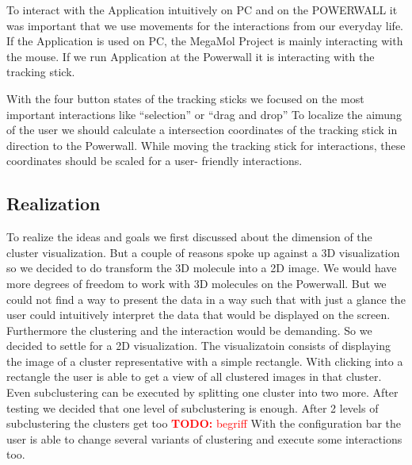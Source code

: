 \documentclass[journal]{vgtc}       %
\newcommand{\todo}[1]{\textcolor{red}{\textbf{TODO:} #1}}
\begin{document}
To interact with the Application intuitively on PC and on the POWERWALL it was important that we use movements for the interactions from our everyday life. If the Application is used on PC, the MegaMol Project is mainly interacting with the mouse. If we run Application at the Powerwall it is interacting with the tracking stick.

With the four button states of the tracking sticks we focused on the most important interactions like ``selection'' or ``drag and drop'' To localize the aimung of the user  we should calculate a intersection coordinates of the tracking stick in direction to the Powerwall. While moving the tracking stick for interactions, these coordinates should be scaled for a user- friendly interactions.

\subsection{Realization}

To realize the ideas and goals we first discussed about the dimension of the cluster visualization. But a couple of reasons spoke up against a 3D visualization so we decided to do transform the 3D molecule into a 2D image. We would have more degrees of freedom to work with 3D molecules on the Powerwall. But we could not find a way to present the data in a way such that with just a glance the user could intuitively interpret the data that would be displayed on the screen. Furthermore the clustering and the interaction would be demanding. So we decided to settle for a 2D visualization. 
The visualizatoin consists of displaying the image of a cluster representative with a simple rectangle. With clicking into a rectangle the user is able to get a view of all clustered images in that cluster. Even subclustering can be executed by splitting one cluster into two more. After testing we decided that one level of subclustering is enough. After 2 levels of subclustering the clusters get too  \todo{begriff}
With the configuration bar the user is able to change several variants of clustering and execute some interactions too. 
\end{document}
